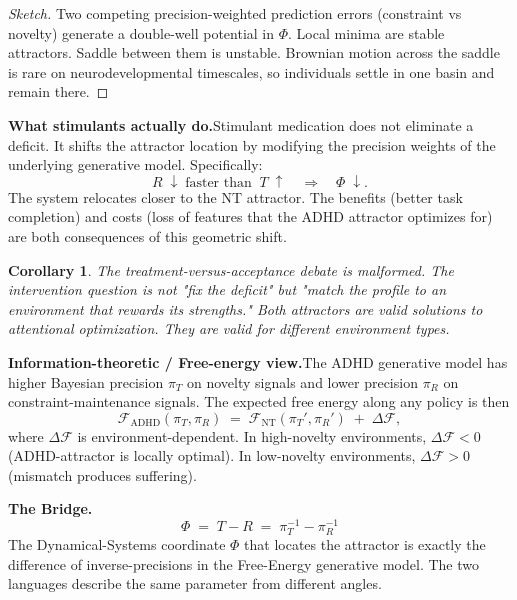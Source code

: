 \documentclass[12pt]{article}
\newtheorem{corollary}{Corollary}
\begin{document}
\begin{proof}[Sketch]
Two competing precision-weighted prediction errors (constraint vs novelty) generate a double-well potential in $\Phi$. Local minima are stable attractors. Saddle between them is unstable. Brownian motion across the saddle is rare on neurodevelopmental timescales, so individuals settle in one basin and remain there.
\end{proof}

\bigskip

\medskip\noindent\textbf{What stimulants actually do.}\quad Stimulant medication does not eliminate a deficit. It shifts the attractor location by modifying the precision weights of the underlying generative model. Specifically:
\[
R \;\downarrow\; \text{faster than} \;\; T \;\uparrow \quad\Longrightarrow\quad \Phi \;\downarrow.
\]
The system relocates closer to the NT attractor. The benefits (better task completion) and costs (loss of features that the ADHD attractor optimizes for) are both consequences of this geometric shift.

\begin{corollary}
The treatment-versus-acceptance debate is malformed. The intervention question is not "fix the deficit" but "match the profile to an environment that rewards its strengths." Both attractors are valid solutions to attentional optimization. They are valid for different environment types.
\end{corollary}

\newpage

\medskip\noindent\textbf{Information-theoretic / Free-energy view.}\quad The ADHD generative model has higher Bayesian precision $\pi_T$ on novelty signals and lower precision $\pi_R$ on constraint-maintenance signals. The expected free energy along any policy is then
\[
\mathcal{F}_{\text{ADHD}}(\pi_T, \pi_R) \;=\; \mathcal{F}_{\text{NT}}(\pi_T', \pi_R') \;+\; \Delta\mathcal{F},
\]
where $\Delta\mathcal{F}$ is environment-dependent. In high-novelty environments, $\Delta\mathcal{F} < 0$ (ADHD-attractor is locally optimal). In low-novelty environments, $\Delta\mathcal{F} > 0$ (mismatch produces suffering).

\bigskip

\medskip\noindent\textbf{The Bridge.}
\[
\boxed{\;\Phi \;=\; T - R \;=\; \pi_T^{-1} - \pi_R^{-1}\;}
\]
The Dynamical-Systems coordinate $\Phi$ that locates the attractor is exactly the difference of inverse-precisions in the Free-Energy generative model. The two languages describe the same parameter from different angles.
\end{document}
